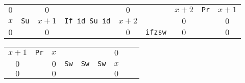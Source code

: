 \documentclass{article}
\begin{document}
\begin{table}[h!]
  \begin{tabular}{c|c|c|c|c|c|c|c|c}
    $0$ &                           & $0$   & \cellcolor{gr}                                       & $0$   & \cellcolor{gr}                                 & $x+2$ & \cellcolor{gr}\texttt{Pr} & $x+1$ \\
    $x$ & \cellcolor{gr}\texttt{Su} & $x+1$ & \multirow{-2}{*}{\cellcolor{gr}\texttt{If id Su id}} & $x+2$ & \cellcolor{gr}                                 & $0$   &                           & $0$   \\
    $0$ &                           & $0$   &                                                      & $0$   & \multirow{-3}{*}{\cellcolor{gr}\texttt{ifzsw}} & $0$   &                           & $0$   \\
  \end{tabular}
\end{table}

\begin{table}[h!]
  \begin{tabular}{c|c|c|c|c|c|c|c|c}
    $x+1$ & \cellcolor{gr}\texttt{Pr} & $x$ & \cellcolor{gr}                              & \cellcolor{gr}                              & \cellcolor{gr}                              & $0$ \\
    $0$   &                           & $0$ & \multirow{-2}{*}{\cellcolor{gr}\texttt{Sw}} & \multirow{-2}{*}{\cellcolor{gr}\texttt{Sw}} & \multirow{-2}{*}{\cellcolor{gr}\texttt{Sw}} & $x$ \\
    $0$   &                           & $0$ &                                             &                                             &                                             & $0$ \\
  \end{tabular}
\end{table}
\end{document}
